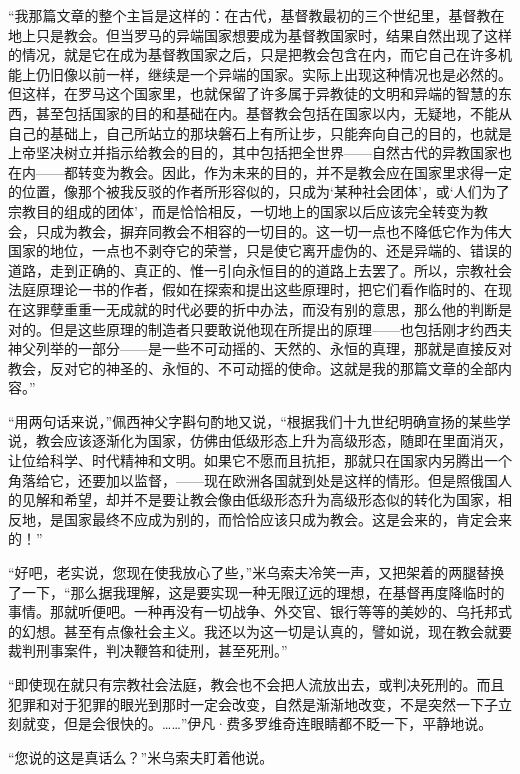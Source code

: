 \par “我那篇文章的整个主旨是这样的：在古代，基督教最初的三个世纪里，基督教在地上只是教会。但当罗马的异端国家想要成为基督教国家时，结果自然出现了这样的情况，就是它在成为基督教国家之后，只是把教会包含在内，而它自己在许多机能上仍旧像以前一样，继续是一个异端的国家。实际上出现这种情况也是必然的。但这样，在罗马这个国家里，也就保留了许多属于异教徒的文明和异端的智慧的东西，甚至包括国家的目的和基础在内。基督教会包括在国家以内，无疑地，不能从自己的基础上，自己所站立的那块磐石上有所让步，只能奔向自己的目的，也就是上帝坚决树立并指示给教会的目的，其中包括把全世界——自然古代的异教国家也在内——都转变为教会。因此，作为未来的目的，并不是教会应在国家里求得一定的位置，像那个被我反驳的作者所形容似的，只成为‘某种社会团体’，或‘人们为了宗教目的组成的团体’，而是恰恰相反，一切地上的国家以后应该完全转变为教会，只成为教会，摒弃同教会不相容的一切目的。这一切一点也不降低它作为伟大国家的地位，一点也不剥夺它的荣誉，只是使它离开虚伪的、还是异端的、错误的道路，走到正确的、真正的、惟一引向永恒目的的道路上去罢了。所以，宗教社会法庭原理论一书的作者，假如在探索和提出这些原理时，把它们看作临时的、在现在这罪孽重重一无成就的时代必要的折中办法，而没有别的意思，那么他的判断是对的。但是这些原理的制造者只要敢说他现在所提出的原理——也包括刚才约西夫神父列举的一部分——是一些不可动摇的、天然的、永恒的真理，那就是直接反对教会，反对它的神圣的、永恒的、不可动摇的使命。这就是我的那篇文章的全部内容。”
\par “用两句话来说，”佩西神父字斟句酌地又说，“根据我们十九世纪明确宣扬的某些学说，教会应该逐渐化为国家，仿佛由低级形态上升为高级形态，随即在里面消灭，让位给科学、时代精神和文明。如果它不愿而且抗拒，那就只在国家内另腾出一个角落给它，还要加以监督，——现在欧洲各国就到处是这样的情形。但是照俄国人的见解和希望，却并不是要让教会像由低级形态升为高级形态似的转化为国家，相反地，是国家最终不应成为别的，而恰恰应该只成为教会。这是会来的，肯定会来的！”
\par “好吧，老实说，您现在使我放心了些，”米乌索夫冷笑一声，又把架着的两腿替换了一下，“那么据我理解，这是要实现一种无限辽远的理想，在基督再度降临时的事情。那就听便吧。一种再没有一切战争、外交官、银行等等的美妙的、乌托邦式的幻想。甚至有点像社会主义。我还以为这一切是认真的，譬如说，现在教会就要裁判刑事案件，判决鞭笞和徒刑，甚至死刑。”
\par “即使现在就只有宗教社会法庭，教会也不会把人流放出去，或判决死刑的。而且犯罪和对于犯罪的眼光到那时一定会改变，自然是渐渐地改变，不是突然一下子立刻就变，但是会很快的。……”伊凡·费多罗维奇连眼睛都不眨一下，平静地说。
\par “您说的这是真话么？”米乌索夫盯着他说。
